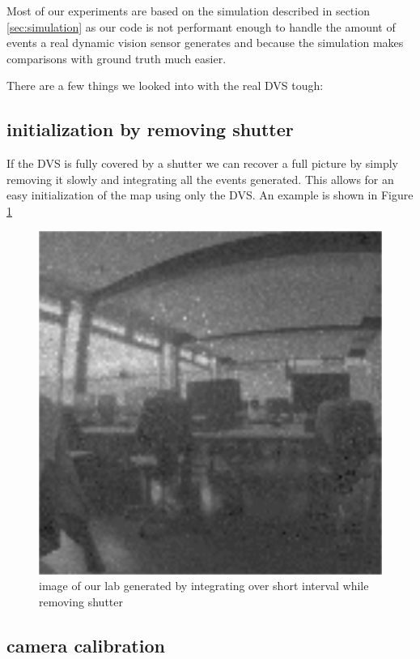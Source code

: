 Most of our experiments are based on the simulation described in section \ref{sec:simulation} as our code is not performant enough to handle
the amount of events a real dynamic vision sensor generates and because the
simulation makes comparisons with ground truth much easier.

There are a few things we looked into with the real DVS tough:

\subsection{initialization by removing shutter}

If the DVS is fully covered by a shutter we can recover a full picture by
simply removing it slowly and integrating all the events generated. This allows
for an easy initialization of the map using only the DVS. An example is shown in Figure \ref{fig:shutter_integration}

\begin{figure}
\includegraphics[width=\linewidth]{images/PCLab_integrated.png}
\caption{image of our lab generated by integrating over short interval while removing shutter}
\label{fig:shutter_integration}
\end{figure}


\subsection{camera calibration}

